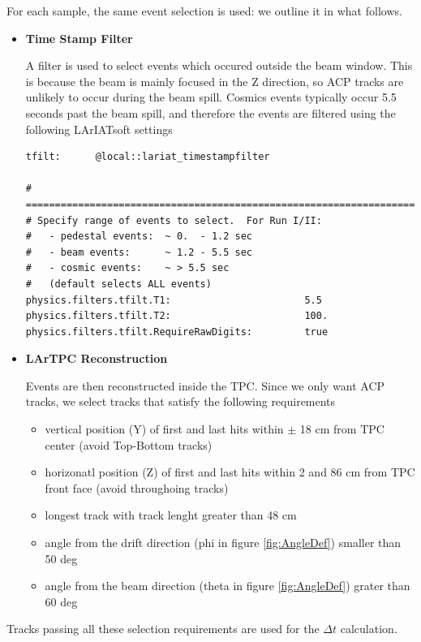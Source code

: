 For each sample, the same event selection is used: we outline it in what follows.
\begin{itemize}
\item \textbf{Time Stamp Filter}

A filter is used to select events which occured outside the beam window. This is because the beam is mainly focused in the Z direction, so ACP tracks are unlikely to occur during the beam spill. Cosmics events typically occur 5.5 seconds past the beam spill, and therefore the events are filtered using the following LArIATsoft settings

\begin{verbatim}
tfilt:      @local::lariat_timestampfilter

# ====================================================================
# Specify range of events to select.  For Run I/II:
#   - pedestal events:  ~ 0.  - 1.2 sec
#   - beam events:      ~ 1.2 - 5.5 sec
#   - cosmic events:    ~ > 5.5 sec
#   (default selects ALL events)
physics.filters.tfilt.T1:                       5.5
physics.filters.tfilt.T2:                       100.
physics.filters.tfilt.RequireRawDigits:         true

\end{verbatim}


\item \textbf{LArTPC Reconstruction}

Events are then reconstructed inside the TPC. Since we only want ACP tracks, we select tracks that satisfy the following requirements

\begin{itemize}
\item vertical position (Y) of first and last hits within $\pm$ 18 cm from TPC center (avoid Top-Bottom tracks) 
\item horizonatl position (Z) of first and last hits within 2 and 86 cm from TPC front face (avoid throughoing tracks) 
\item longest track with track lenght greater than 48 cm
\item angle from the drift direction (phi in figure \ref{fig:AngleDef}) smaller than 50 deg 
\item angle from the beam direction (theta in figure \ref{fig:AngleDef}) grater than 60 deg
\end{itemize}




\end{itemize}

Tracks passing all these selection requirements are used for the $\Delta t$ calculation.


